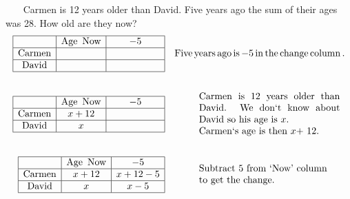\begin{example}\label{Lin83}~~~ Carmen is 12 years older than David. Five years ago the sum of their ages was 28. How old are they now?
  \begin{eqnarray*}
    \begin{array}{|c|c|c|}
      \hline
      & \tmop{Age~} \tmop{Now} & - 5\\
      \hline
      \tmop{Carmen} &  & \mbox{\hspace{.7in}}\\
      \hline
      \tmop{David} &  & \\
      \hline
    \end{array} &  & \tmop{Five} \tmop{years} \tmop{ago} \tmop{is} - 5
    \tmop{in} \tmop{the} \tmop{change} \tmop{column}.\\
    &  & \\
    \begin{array}{|c|c|c|}
      \hline
      & \tmop{Age~} \tmop{Now} & - 5\\
      \hline
      \tmop{Carmen} & x + 12 & \mbox{\hspace{.7in}}\\
      \hline
      \tmop{David} & x & \\
      \hline
    \end{array} &  & \begin{array}{p{0.425\textwidth}}
      \tmop{Carmen} \tmop{is} 12 \tmop{years} \tmop{older} \tmop{than}
      \tmop{David}. \tmop{We} \tmop{don`t} \tmop{know} \tmop{about} \tmop{David} \tmop{so} \tmop{his~age} \tmop{is} $x$.\\
      \tmop{Carmen`s~age~is} \tmop{then} $x +$ 12.
    \end{array}\\
    &  & \\
    \begin{array}{|c|c|c|}
      \hline
      & \tmop{Age~} \tmop{Now} & - 5\\
      \hline
      \tmop{Carmen} & x + 12 & x + 12 - 5\\
      \hline
      \tmop{David} & x & x - 5\\
      \hline
    \end{array} &  & \begin{array}{p{0.425\textwidth}}\tmop{Subtract} 5 \tmop{from} \tmop{`Now'} \tmop{column}\\
    \tmop{to} \tmop{get} \tmop{the} \tmop{change}.\\

\end{array}
\end{eqnarray*}
\end{example}
